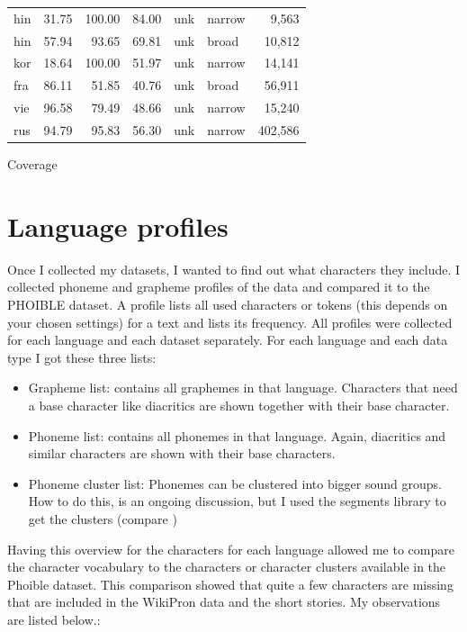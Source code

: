 {\begin{tabularx}{\textwidth}{|lrrrXXr|}
hin &     31.75 &  100.00 &   84.00 &      unk &    narrow &         9,563 \\
hin &     57.94 &   93.65 &   69.81 &      unk &     broad &        10,812 \\
kor &     18.64 &  100.00 &   51.97 &      unk &    narrow &        14,141 \\
fra &     86.11 &   51.85 &   40.76 &      unk &     broad &        56,911 \\
vie &     96.58 &   79.49 &   48.66 &      unk &    narrow &        15,240 \\
rus &     94.79 &   95.83 &   56.30 &      unk &    narrow &       402,586 \\
\hline
\end{tabularx}}{Coverage}

\section{Language profiles}
Once I collected my datasets, I wanted to find out what characters they include. I collected phoneme and grapheme profiles of the data and compared it to the PHOIBLE dataset. A profile lists all used characters or tokens (this depends on your chosen settings) for a text and lists its frequency. All profiles were collected for each language and each dataset separately. For each language and each data type I got these three lists:
\begin{itemize}
 \item Grapheme list: contains all graphemes in that language. Characters that need a base character like diacritics are shown together with their base character. 
 \item Phoneme list: contains all phonemes in that language. Again, diacritics and similar characters are shown with their base characters.
 \item Phoneme cluster list: Phonemes can be clustered into bigger sound groups. How to do this, is an ongoing discussion, but I used the segments library to get the clusters (compare \citet{unicode-lingu})
\end{itemize}

Having this overview for the characters for each language allowed me to compare the character vocabulary to the characters or character clusters available in the Phoible dataset. This comparison showed that quite a few characters are missing that are included in the WikiPron data and the short stories. My observations are listed below.:

